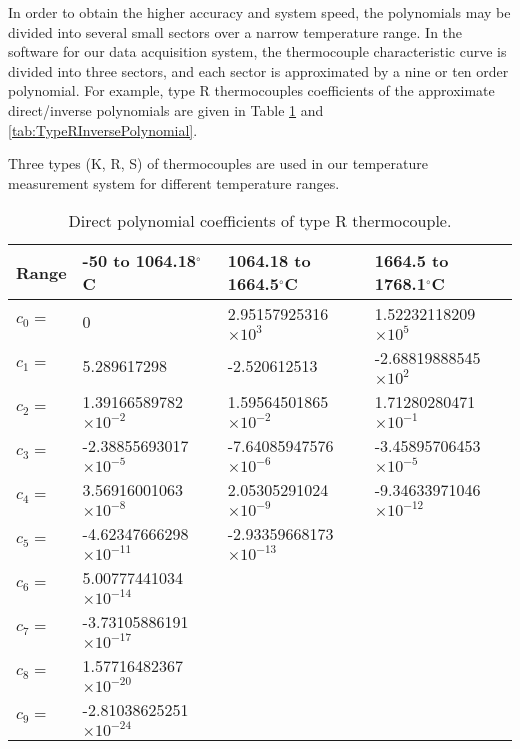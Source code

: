 In order to obtain the higher accuracy and system speed, the polynomials may be divided into several small sectors over a narrow temperature range.
In the software for our data acquisition system, the thermocouple characteristic curve is divided into three sectors, and each sector is approximated by a nine or ten order
polynomial.
For example, type R thermocouples coefficients of the approximate direct/inverse polynomials are given in Table \ref{tab:TypeRDirectPolynomial} and \ref{tab:TypeRInversePolynomial}.

Three types (K, R, S) of thermocouples are used in our temperature measurement system for different temperature ranges.

\begin{table}[htbp]
  \centering
  \small
  \caption{Direct polynomial coefficients of type R thermocouple.}
    \begin{tabular}{llll}
    \toprule
    Range & -50 to 1064.18$^{\circ}$C & 1064.18 to 1664.5$^{\circ}$C & 1664.5 to 1768.1$^{\circ}$C \\
    \midrule
    $c_0=$ & 0     & 2.95157925316$\times10^{3}$ & 1.52232118209$\times10^{5}$ \\
    $c_1=$ & 5.289617298 & -2.520612513 & -2.68819888545$\times10^{2}$ \\
    $c_2=$ & 1.39166589782$\times10^{-2}$ & 1.59564501865$\times10^{-2}$ & 1.71280280471$\times10^{-1}$ \\
    $c_3=$ & -2.38855693017$\times10^{-5}$ & -7.64085947576$\times10^{-6}$ & -3.45895706453$\times10^{-5}$ \\
    $c_4=$ & 3.56916001063$\times10^{-8}$ & 2.05305291024$\times10^{-9}$ & -9.34633971046$\times10^{-12}$ \\
    $c_5=$ & -4.62347666298$\times10^{-11}$ & -2.93359668173$\times10^{-13}$ &  \\
    $c_6=$ & 5.00777441034$\times10^{-14}$ &       &  \\
    $c_7=$ & -3.73105886191$\times10^{-17}$ &       &  \\
    $c_8=$ & 1.57716482367$\times10^{-20}$ &       &  \\
    $c_9=$ & -2.81038625251$\times10^{-24}$ &       &  \\
    \bottomrule
    \end{tabular}%
  \label{tab:TypeRDirectPolynomial}%
\end{table}%


